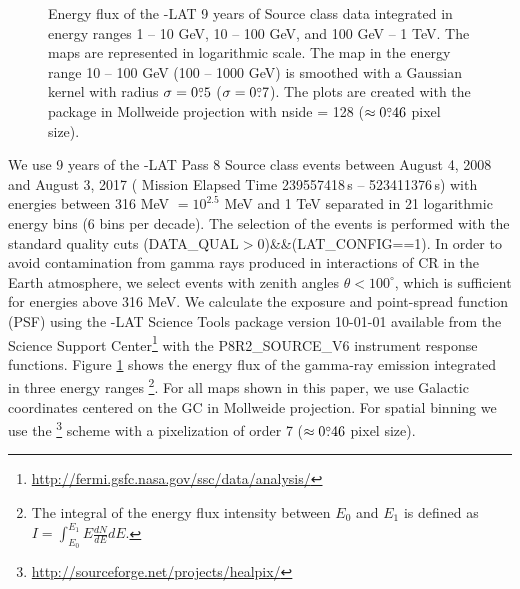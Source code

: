 \begin{figure}[h]
\caption{
Energy flux of the \Fermi-LAT 9 years of Source class data integrated in energy ranges 1 -- 10 GeV, 10 -- 100 GeV, and 100 GeV -- 1 TeV.
The maps are represented in logarithmic scale. 
The map in the energy range 10 -- 100 GeV (100 -- 1000 GeV) 
is smoothed with a Gaussian kernel with radius $\sigma = 0{\overset{\circ}{.}}5$ ($\sigma = 0{\overset{\circ}{.}}7$).
The plots are created with the \Healpix package \citep{2005ApJ...622..759G} in Mollweide projection with 
nside = 128 ($\approx 0{\overset{\circ}{.}}46$ pixel size). 
}
\label{fig:Maps_data}
\end{figure}

We use 9 years of the \Fermi-LAT Pass 8 Source class events
between August 4, 2008  and August 3, 2017 ({\Fermi} Mission Elapsed Time 239557418\,s -- 523411376\,s)
with energies between 316 MeV $ = 10^{2.5}$ MeV
and 1 TeV separated in 21 logarithmic energy bins (6 bins per decade).
The selection of the events is performed with the standard quality cuts (DATA\_QUAL$>$0)\&\&(LAT\_CONFIG==1).
In order to avoid contamination from gamma rays produced in interactions of CR in the Earth atmosphere, 
we select events with zenith angles $\theta < 100^{\circ}$,
which is sufficient for energies above 316 MeV.
We calculate the exposure and point-spread function (PSF) using the {\Fermi}-LAT Science Tools package version 
10-01-01 available from the {\Fermi} Science Support Center\footnote{\url{http://fermi.gsfc.nasa.gov/ssc/data/analysis/}} 
with the P8R2\_SOURCE\_V6 instrument response functions.
Figure \ref{fig:Maps_data} shows the energy flux of the gamma-ray emission
integrated in three energy ranges%
\footnote{The integral of the energy flux intensity between $E_0$ and $E_1$ is defined as
$I = \int_{E_0}^{E_1} E \frac{dN}{dE} dE.$}.
For all maps shown in this paper, we use Galactic coordinates centered on the GC in Mollweide projection. %
For spatial binning we use the \Healpix\footnote{\url{http://sourceforge.net/projects/healpix/}} \citep{2005ApJ...622..759G} scheme with a pixelization of order 7  
($\approx 0{\overset{\circ}{.}}46$ pixel size). 

